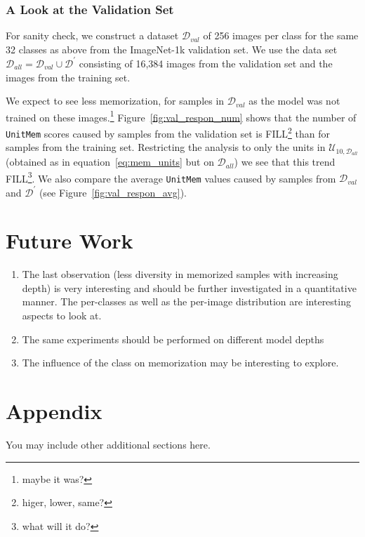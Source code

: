 \documentclass{article} %
\begin{document}
\subsubsection{A Look at the Validation Set}
For sanity check, we construct a dataset $\mathcal{D}_{val}$ of 256 images per class for the same 32 classes as above from the ImageNet-1k validation set.
We use the data set $\mathcal{D}_{all} = \mathcal{D}_{val} \cup \mathcal{D}^\prime$ consisting of 16,384 images from the validation set and the images from the training set.

We expect to see less memorization, for samples in $\mathcal{D}_{val}$ as the model was not trained on these images.\footnote{maybe it was?}
Figure~\ref{fig:val_respon_num} shows that the number of \texttt{UnitMem} scores caused by samples from the validation set is FILL\footnote{higer, lower, same?} than for samples from the training set.
Restricting the analysis to only the units in $\mathcal{U}_{10,\mathcal{D}_{all}}$ (obtained as in equation~\ref{eq:mem_units} but on $\mathcal{D}_{all}$) we see that this trend FILL\footnote{what will it do?}.
We also compare the average \texttt{UnitMem} values caused by samples from $\mathcal{D}_{val}$ and $\mathcal{D}^\prime$ (see Figure~\ref{fig:val_respon_avg}).

\section{Future Work}
\begin{enumerate}
   \item The last observation (less diversity in memorized samples with increasing depth) is very interesting and should be further investigated in a quantitative manner.
   The per-classes as well as the per-image distribution are interesting aspects to look at.
   \item The same experiments should be performed on different model depths
   \item The influence of the class on memorization may be interesting to explore.
\end{enumerate}






\appendix
\section{Appendix}
You may include other additional sections here.
\end{document}
